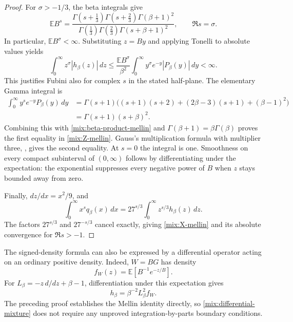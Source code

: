 \documentclass[11pt,a4paper]{article}
\numberwithin{equation}{section}
\theoremstyle{definition}\newtheorem{definition}[theorem]{Definition}
\theoremstyle{remark}\newtheorem{remark}[theorem]{Remark}
\begin{document}
\begin{proof}
For \(\sigma>-1/3\), the beta integrals give
\begin{equation}\label{mix:beta-product-mellin}
 \mathbb E B^s
 =\frac{\Gamma(s+\frac13)\Gamma(s+\frac23)
             \Gamma(\beta+1)^2}
       {\Gamma(\frac13)\Gamma(\frac23)
             \Gamma(s+\beta+1)^2},
       \qquad \Re s=\sigma.
\end{equation}
In particular, \(\mathbb E B^\sigma<\infty\).  Substituting
\(z=By\) and applying Tonelli to absolute values yields
\[
 \int_0^\infty z^\sigma|h_\beta(z)|\,dz
 \le\frac{\mathbb E B^\sigma}{\beta^2}
       \int_0^\infty y^\sigma e^{-y}|P_\beta(y)|\,dy<\infty.
\]
This justifies Fubini also for complex \(s\) in the stated half-plane.
The elementary Gamma integral is
\begin{align*}
 \int_0^\infty y^s e^{-y}P_\beta(y)\,dy
 &=\Gamma(s+1)\bigl((s+1)(s+2)
                +(2\beta-3)(s+1)+(\beta-1)^2\bigr)\\
 &=\Gamma(s+1)(s+\beta)^2.
\end{align*}
Combining this with \eqref{mix:beta-product-mellin} and
\(\Gamma(\beta+1)=\beta\Gamma(\beta)\) proves the first equality
in \eqref{mix:Z-mellin}.  Gauss's multiplication formula with
multiplier three, \cite[\S5.5(iii), Eq.~5.5.6]{DLMF}, gives the
second equality.  At \(s=0\) the integral is one.  Smoothness on
every compact subinterval of \((0,\infty)\) follows by differentiating
under the expectation: the exponential suppresses every negative
power of \(B\) when \(z\) stays bounded away from zero.

Finally, \(dz/dx=x^2/9\), and
\[
 \int_0^\infty x^s q_\beta(x)\,dx
 =27^{s/3}\int_0^\infty z^{s/3}h_\beta(z)\,dz.
\]
The factors \(27^{s/3}\) and \(27^{-s/3}\) cancel exactly, giving
\eqref{mix:X-mellin} and its absolute convergence for \(\Re s>-1\).
\end{proof}

The signed-density formula can also be expressed by a differential
operator acting on an ordinary positive density.  Indeed, \(W=BG\)
has density
\[
 f_W(z)=\mathbb E[B^{-1}e^{-z/B}].
\]
For \(L_\beta=-z\,d/dz+\beta-1\), differentiation under this
expectation gives
\begin{equation}\label{mix:differential-mixture}
              h_\beta=\beta^{-2}L_\beta^2f_W.
\end{equation}
The preceding proof establishes the Mellin identity directly, so
\eqref{mix:differential-mixture} does not require any unproved
integration-by-parts boundary conditions.
\end{document}
